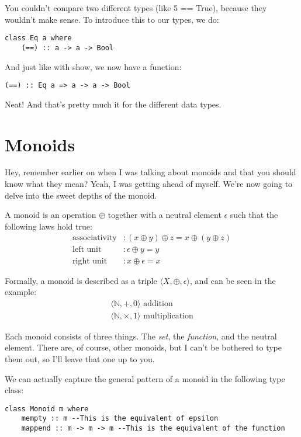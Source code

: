 \documentclass[11pt,a4paper,titlepage,dvipsnames,cmyk]{scrartcl}
\begin{document}
You couldn't compare two different types (like 5 == True), because they wouldn't
make sense. To introduce this to our types, we do:

\begin{lstlisting}[style=B]
class Eq a where
    (==) :: a -> a -> Bool
\end{lstlisting}
And just like with show, we now have a function:
\begin{lstlisting}[style=B]
(==) :: Eq a => a -> a -> Bool
\end{lstlisting}

Neat! And that's pretty much it for the different data types.

\section{Monoids}%
\label{sec:Monoids}
Hey, remember earlier on when I was talking about monoids and that you should
know what they mean? Yeah, I was getting ahead of myself. We're now going to
delve into the sweet depths of the monoid.

A monoid is an operation $\oplus$ together with a  neutral element
$\epsilon$ such that the following laws hold true:
\begin{align*}
    \text{associativity} &: (x \oplus y) \oplus z = x \oplus (y \oplus z) \\
    \text{left unit}  &: \epsilon \oplus y = y \\
    \text{right unit} &: x \oplus \epsilon = x
\end{align*}

Formally, a monoid is described as a triple $\langle X, \oplus, \epsilon
\rangle$, and can be seen in the example:
\begin{gather*}
    \langle \mathbb{N}, +, 0 \rangle \text{ addition} \\
    \langle \mathbb{N}, \times, 1 \rangle \text{ multiplication}
\end{gather*}

Each monoid consists of three things. The \textit{set}, the
\textit{function}, and the neutral element. There are, of course, other
monoids, but I can't be bothered to type them out, so I'll leave that one
up to you.

We can actually capture the general pattern of a monoid in the following
type class:
\begin{lstlisting}[style=B]
class Monoid m where
    mempty :: m --This is the equivalent of epsilon
    mappend :: m -> m -> m --This is the equivalent of the function
\end{lstlisting}
\end{document}
